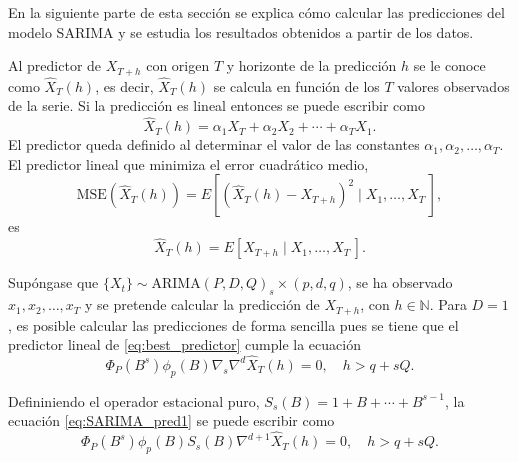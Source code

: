 \documentclass[12pt,twoside]{article}
\newcommand{\arima}{\text{ARIMA}}
\begin{document}
En la siguiente parte de esta sección se explica cómo calcular las predicciones del modelo SARIMA y se estudia los resultados obtenidos a partir de los datos.

Al predictor de $X_{T+h}$ con origen $T$ y horizonte de la predicción $h$ se le conoce como $\hat{X}_T(h)$, es decir, $\hat{X}_T(h)$ se calcula en función de los $T$ valores observados de la serie. Si la predicción es lineal entonces se puede escribir como
\begin{equation*}
    \hat{X}_T(h) = \alpha_1X_T + \alpha_2X_2 + \dotsb + \alpha_T X_1.
\end{equation*}
El predictor queda definido al determinar el valor de las constantes $\alpha_1, \alpha_2, \dotsc ,\alpha_T$. El predictor lineal que minimiza el error cuadrático medio, $$\text{MSE}(\hat{X}_T(h)) = E[(\hat{X}_T(h) - X_{T+h})^2 \mid  X_1, \dotsc, X_T\,],$$ es 
\begin{equation} \label{eq:best_predictor}
    \hat{X}_T(h) = E[X_{T+h}\mid X_1, \dotsc, X_T\,].
\end{equation}

Supóngase que $\{X_t\} \sim \arima(P,D,Q)_s \times (p,d,q)$, se ha observado $x_1, x_2, \dotsc, x_T$ y se pretende calcular la predicción de $X_{T+h}$, con $h\in \mathbb{N}$. Para $D=1$, es posible calcular las predicciones de forma sencilla pues se tiene que el predictor lineal de \eqref{eq:best_predictor} cumple la ecuación
\begin{equation}\label{eq:SARIMA_pred1}
    \Phi_P(B^s) \phi_p(B) \nabla_s \nabla^d \hat{X}_T(h) = 0,\quad h > q+ sQ.
\end{equation}

Defininiendo el operador estacional puro, $S_s(B) = 1 + B + \dotsb + B ^{s-1}$, la ecuación \eqref{eq:SARIMA_pred1} se puede escribir como
\begin{equation}\label{eq:SARIMA_pred2}
    \Phi_P(B^s) \phi_p(B) S_s(B) \nabla^{d+1} \hat{X}_T(h) = 0,\quad h > q+ sQ.
\end{equation}
\end{document}
